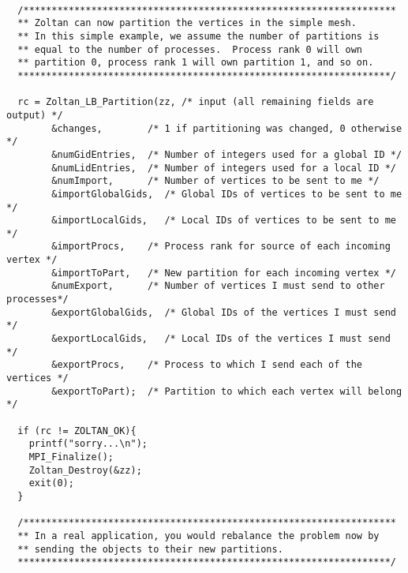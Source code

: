 \clearpage
\begin{flushleft}
\begin{verbatim}

  /******************************************************************
  ** Zoltan can now partition the vertices in the simple mesh.
  ** In this simple example, we assume the number of partitions is
  ** equal to the number of processes.  Process rank 0 will own
  ** partition 0, process rank 1 will own partition 1, and so on.
  ******************************************************************/

  rc = Zoltan_LB_Partition(zz, /* input (all remaining fields are output) */
        &changes,        /* 1 if partitioning was changed, 0 otherwise */ 
        &numGidEntries,  /* Number of integers used for a global ID */
        &numLidEntries,  /* Number of integers used for a local ID */
        &numImport,      /* Number of vertices to be sent to me */
        &importGlobalGids,  /* Global IDs of vertices to be sent to me */
        &importLocalGids,   /* Local IDs of vertices to be sent to me */
        &importProcs,    /* Process rank for source of each incoming vertex */
        &importToPart,   /* New partition for each incoming vertex */
        &numExport,      /* Number of vertices I must send to other processes*/
        &exportGlobalGids,  /* Global IDs of the vertices I must send */
        &exportLocalGids,   /* Local IDs of the vertices I must send */
        &exportProcs,    /* Process to which I send each of the vertices */
        &exportToPart);  /* Partition to which each vertex will belong */

  if (rc != ZOLTAN_OK){
    printf("sorry...\n");
    MPI_Finalize();
    Zoltan_Destroy(&zz);
    exit(0);
  }

  /******************************************************************
  ** In a real application, you would rebalance the problem now by
  ** sending the objects to their new partitions.
  ******************************************************************/

\end{verbatim}
\end{flushleft}

